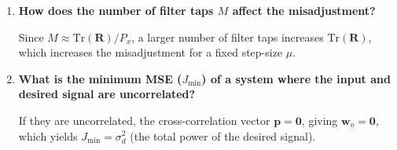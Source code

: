 \documentclass[12pt,a4paper]{article}
\newcommand{\Q}[1]{\textbf{#1}\par\noindent\ignorespaces}
\begin{document}
\begin{tcolorbox}[exambox, title={\textbf{Frequently Asked / Viva Questions}}]
\begin{enumerate}[topsep=0pt, label=\textbf{Q\arabic*.}, itemsep=5pt]
  \item \Q{How does the number of filter taps $M$ affect the misadjustment?}
    Since $M \approx \text{Tr}(\mathbf{R})/P_x$, a larger number of filter taps increases $\text{Tr}(\mathbf{R})$, which increases the misadjustment for a fixed step-size $\mu$.
  \item \Q{What is the minimum MSE ($J_{\text{min}}$) of a system where the input and desired signal are uncorrelated?}
    If they are uncorrelated, the cross-correlation vector $\mathbf{p} = \mathbf{0}$, giving $\mathbf{w}_o = \mathbf{0}$, which yields $J_{\text{min}} = \sigma_d^2$ (the total power of the desired signal).
\end{enumerate}
\end{tcolorbox}
\end{document}

